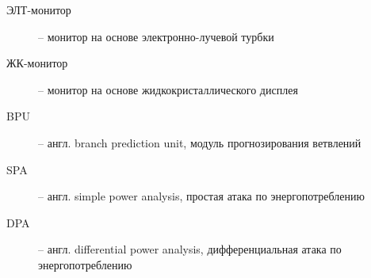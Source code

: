 
\begin{description}
\item[ЭЛТ-монитор] -- монитор на основе электронно-лучевой турбки
\item[ЖК-монитор] -- монитор на основе жидкокристаллического дисплея
\item[BPU] -- англ. branch prediction unit, модуль прогнозирования ветвлений
\item[SPA] -- англ. simple power analysis, простая атака по энергопотреблению
\item[DPA] -- англ. differential power analysis, дифференциальная атака по
  энергопотреблению
\end{description}

\clearpage


\clearpage
